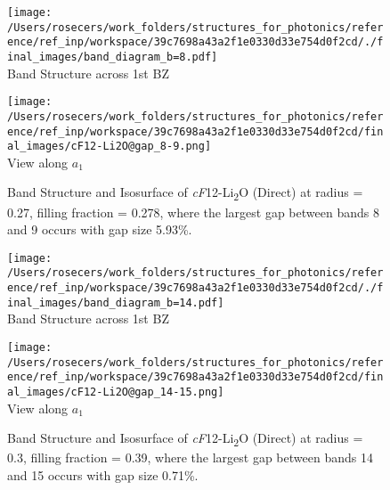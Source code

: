 \begin{figure}[H]
\begin{minipage}{0.5\textwidth}\centering
\texttt{[image: /Users/rosecers/work\_folders/structures\_for\_photonics/reference/ref\_inp/workspace/39c7698a43a2f1e0330d33e754d0f2cd/./final\_images/band\_diagram\_b=8.pdf]}
\\Band Structure across 1st BZ
\end{minipage}\hfill
\begin{minipage}{0.48\textwidth}\centering
\texttt{[image: /Users/rosecers/work\_folders/structures\_for\_photonics/reference/ref\_inp/workspace/39c7698a43a2f1e0330d33e754d0f2cd/final\_images/cF12-Li2O@gap\_8-9.png]}
\\View along $a_1$ 
\end{minipage}\hfill\caption{Band Structure and Isosurface of \textit{cF}12-Li\textsubscript{2}O (Direct) at radius = 0.27, filling fraction = 0.278, where the largest gap between bands 8 and 9 occurs with gap size 5.93\%.}

\end{figure}
\vspace{-0.25in}


\begin{figure}[H]
\begin{minipage}{0.5\textwidth}\centering
\texttt{[image: /Users/rosecers/work\_folders/structures\_for\_photonics/reference/ref\_inp/workspace/39c7698a43a2f1e0330d33e754d0f2cd/./final\_images/band\_diagram\_b=14.pdf]}
\\Band Structure across 1st BZ
\end{minipage}\hfill
\begin{minipage}{0.48\textwidth}\centering
\texttt{[image: /Users/rosecers/work\_folders/structures\_for\_photonics/reference/ref\_inp/workspace/39c7698a43a2f1e0330d33e754d0f2cd/final\_images/cF12-Li2O@gap\_14-15.png]}
\\View along $a_1$ 
\end{minipage}\hfill\caption{Band Structure and Isosurface of \textit{cF}12-Li\textsubscript{2}O (Direct) at radius = 0.3, filling fraction = 0.39, where the largest gap between bands 14 and 15 occurs with gap size 0.71\%.}

\end{figure}
\vspace{-0.25in}


